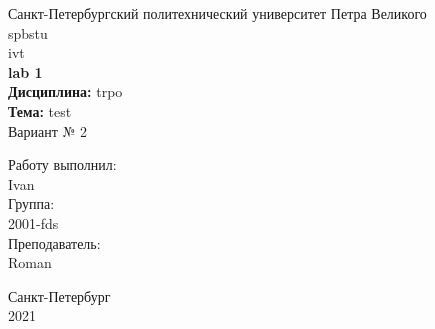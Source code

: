 \documentclass[12pt,a4paper]{scrartcl}
\begin{document}
\begin{titlepage}
\begin{center}

\large
Санкт-Петербургский политехнический университет Петра Великого %
\\
spbstu %
\\
ivt %
\\[5.5cm]


\large \textbf{
lab %
1 %
}\\
\large \textbf{Дисциплина:}
trpo %
\\
\large \textbf{Тема:} %
test %
\\
\large Вариант № %
2 %
\\ [3.7cm]


\end{center}

\vfill

\hfill\begin{minipage}{0.25\textwidth}
  Работу выполнил:\\
Ivan %
  \\
  Группа:\\
2001-fds %
    \\
    Преподаватель:\\
Roman %
    \\
\end{minipage}%

\vfill

\begin{center}
\large Санкт-Петербург %
\\
2021 %
\end{center} 

\end{titlepage}
\end{document}
